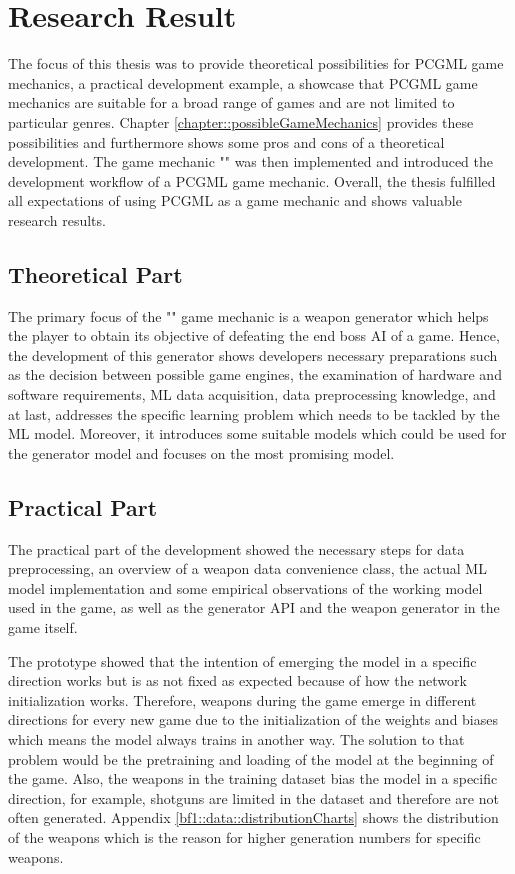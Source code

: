 \documentclass[MGS,Master,english]{twbook}%
\begin{document}
\section{Research Result}
The focus of this thesis was to provide theoretical possibilities for PCGML game mechanics, a practical development example, a showcase that PCGML game mechanics are suitable for a broad range of games and are not limited to particular genres. Chapter \ref{chapter::possibleGameMechanics} provides these possibilities and furthermore shows some pros and cons of a theoretical development. The game mechanic "" was then implemented and introduced the development workflow of a PCGML game mechanic. Overall, the thesis fulfilled all expectations of using PCGML as a game mechanic and shows valuable research results.

\subsection{Theoretical Part}
The primary focus of the "" game mechanic is a weapon generator which helps the player to obtain its objective of defeating the end boss AI of a game. Hence, the development of this generator shows developers necessary preparations such as the decision between possible game engines, the examination of hardware and software requirements, ML data acquisition, data preprocessing knowledge, and at last, addresses the specific learning problem which needs to be tackled by the ML model. Moreover, it introduces some suitable models which could be used for the generator model and focuses on the most promising model.

\subsection{Practical Part}
The practical part of the development showed the necessary steps for data preprocessing, an  overview of a weapon data convenience class, the actual ML model implementation and some empirical observations of the working model used in the game, as well as the generator API and the weapon generator in the game itself.

The prototype showed that the intention of emerging the model in a specific direction works but is as not fixed as expected because of how the network initialization works. Therefore, weapons during the game emerge in different directions for every new game due to the initialization of the weights and biases which means the model always trains in another way. The solution to that problem would be the pretraining and loading of the model at the beginning of the game. Also, the weapons in the training dataset bias the model in a specific direction, for example, shotguns are limited in the dataset and therefore are not often generated. Appendix \ref{bf1::data::distributionCharts} shows the distribution of the weapons which is the reason for higher generation numbers for specific weapons. 
\end{document}

